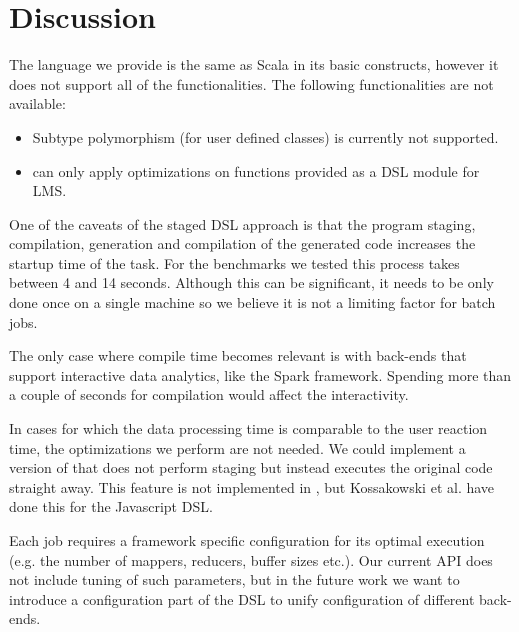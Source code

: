 \section{Discussion}
\label{sec:discussion}
 
The language we provide is the same as Scala in its basic constructs, however it
does not support all of the functionalities. The following functionalities are
not available:
\begin{itemize}
\item Subtype polymorphism (for user defined classes) is currently not
supported.
\item \tool can only apply optimizations on functions provided as a DSL module
for LMS.
\end{itemize}



One of the caveats of the staged DSL approach is that the program staging,
compilation, generation and compilation of the generated code increases the
startup time of the task. For the benchmarks we tested this process takes
between 4 and 14 seconds. Although this can be significant, it needs
to be only done once on a single machine so we believe it is not a limiting
factor for batch jobs.

The only case where compile time becomes relevant is with back-ends that support
interactive data analytics, like the Spark framework. Spending more than a
couple of seconds for compilation would affect the interactivity.

In cases for which the data processing time is comparable to the user reaction
time, the optimizations we perform are not needed. We could implement a version
of \tool that does not perform staging but instead executes the original code
straight away.
This feature is not
implemented in \tool, but Kossakowski et al. \cite{greg} have done this for the
Javascript DSL.

Each job requires a framework specific configuration for its optimal execution
(e.g. the number of mappers, reducers, buffer sizes etc.). Our current API does
not include tuning of such parameters, but in the future work we want to
introduce a configuration part of the DSL to unify configuration of different
back-ends.
